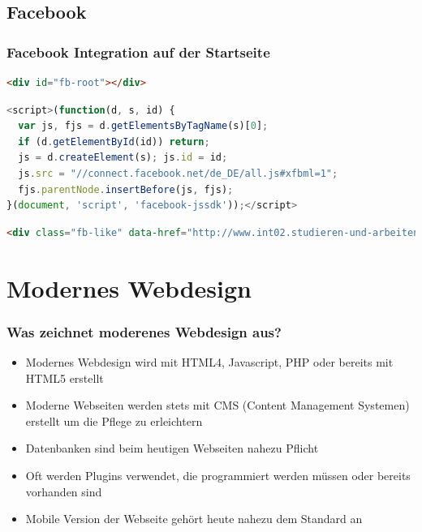 \documentclass[xcolor=dvipsnames]{beamer}
\begin{document}
\subsection{Facebook}
\begin{frame}[fragile]
  \frametitle{Facebook Integration auf der Startseite}

\begin{lstlisting}[language=HTML]
<div id="fb-root"></div>
\end{lstlisting}

\begin{lstlisting}[language=JavaScript, firstnumber=3]
<script>(function(d, s, id) {
  var js, fjs = d.getElementsByTagName(s)[0];
  if (d.getElementById(id)) return;
  js = d.createElement(s); js.id = id;
  js.src = "//connect.facebook.net/de_DE/all.js#xfbml=1";
  fjs.parentNode.insertBefore(js, fjs);
}(document, 'script', 'facebook-jssdk'));</script>
\end{lstlisting}

\begin{lstlisting}[language=HTML, firstnumber=26]
<div class="fb-like" data-href="http://www.int02.studieren-und-arbeiten.de/" data-send="false" data-width="450" data-show-faces="true"></div>
\end{lstlisting}



\end{frame}


\section{Modernes Webdesign}
\begin{frame} %
  \frametitle{Was zeichnet moderenes Webdesign aus?} %
  \begin{block}{}
	\begin{itemize}
		\item Modernes Webdesign wird mit HTML4, Javascript, PHP oder bereits mit HTML5 erstellt
		\item Moderne Webseiten werden stets mit CMS (Content Management Systemen) erstellt um die Pflege zu erleichtern
		\item Datenbanken sind beim heutigen Webseiten nahezu Pflicht
		\item Oft werden Plugins verwendet, die programmiert werden müssen oder bereits vorhanden sind
		\item Mobile Version der Webseite gehört heute nahezu dem Standard an
	\end{itemize}
  \end{block}
\end{frame}
\end{document}
